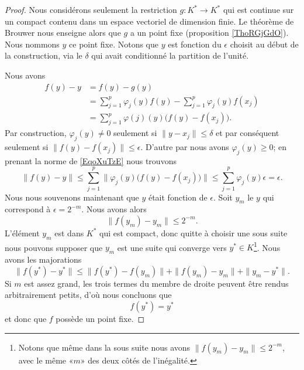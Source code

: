 \begin{proof}
    Nous considérons seulement la restriction \( g\colon K^*\to K^*\) qui est continue sur un compact contenu dans un espace vectoriel de dimension finie. Le théorème de Brouwer nous enseigne alors que \( g\) a un point fixe (proposition \ref{ThoRGjGdO}). Nous nommons \( y\) ce point fixe. Notons que \( y\) est fonction du \( \epsilon\) choisit au début de la construction, via le \( \delta\) qui avait conditionné la partition de l'unité.

    Nous avons
    \begin{subequations}        \label{EqoXuTzE}
        \begin{align}
            f(y)-y&=f(y)-g(y)\\
            &=\sum_{j=1}^p\varphi_j(y)f(y)-\sum_{j=1}^p\varphi_j(y)f(x_j)\\
            &=\sum_{j=1}^p\varphi(j)(y)\big( f(y)-f(x_j) \big).
        \end{align}
    \end{subequations}
    Par construction, \( \varphi_j(y)\neq 0\) seulement si \( \| y-x_j \|\leq \delta\) et par conséquent seulement si \( \| f(y)-f(x_j) \|\leq \epsilon\). D'autre par nous avons \( \varphi_j(y)\geq 0\); en prenant la norme de \eqref{EqoXuTzE} nous trouvons
    \begin{equation}
        \| f(y)-y \|\leq \sum_{j=1}^p\| \varphi_j(y)\big( f(y)-f(x_j) \big) \|\leq \sum_{j=1}^p\varphi_j(y)\epsilon=\epsilon.
    \end{equation}
    Nous nous souvenons maintenant que \( y\) était fonction de \( \epsilon\). Soit \( y_m\) le \( y\) qui correspond à \( \epsilon=2^{-m}\). Nous avons alors
    \begin{equation}
        \| f(y_m)-y_m \|\leq 2^{-m}.
    \end{equation}
    L'élément \( y_m\) est dans \( K^*\) qui est compact, donc quitte à choisir une sous suite nous pouvons supposer que \( y_m\) est une suite qui converge vers \( y^*\in K\)\footnote{Notons que même dans la sous suite nous avons \( \| f(y_m)-y_m \|\leq 2^{-m}\), avec le même «\( m\)» des deux côtés de l'inégalité.}. Nous avons les majorations
    \begin{equation}
        \| f(y^*)-y^* \|\leq \| f(y^*)-f(y_m) \|+\| f(y_m)-y_m \|+\| y_m-y^* \|.
    \end{equation}
    Si \( m\) est assez grand, les trois termes du membre de droite peuvent être rendus arbitrairement petits, d'où nous concluons que
    \begin{equation}
        f(y^*)=y^*
    \end{equation}
    et donc que \( f\) possède un point fixe.
\end{proof}


